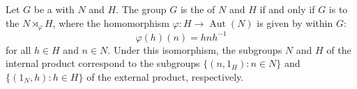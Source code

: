 \begin{theorem} \label{theorem:internal_and_external_semidirect_products_are_isomorphic}
Let $G$ be a  with  $N$ and $H$.
The group $G$ is the  of $N$ and $H$ if and only if $G$ is  to the  $N \rtimes_\varphi H$, where the homomorphism $\varphi: H \to \operatorname{Aut}(N)$ is given by  within $G$:
$$ \varphi(h)(n) = hnh^{-1} $$
for all $h \in H$ and $n \in N$. Under this isomorphism, the subgroups $N$ and $H$ of the internal product correspond to the subgroups $\{(n, 1_H) : n \in N\}$ and $\{(1_N, h) : h \in H\}$ of the external product, respectively.
\end{theorem}

